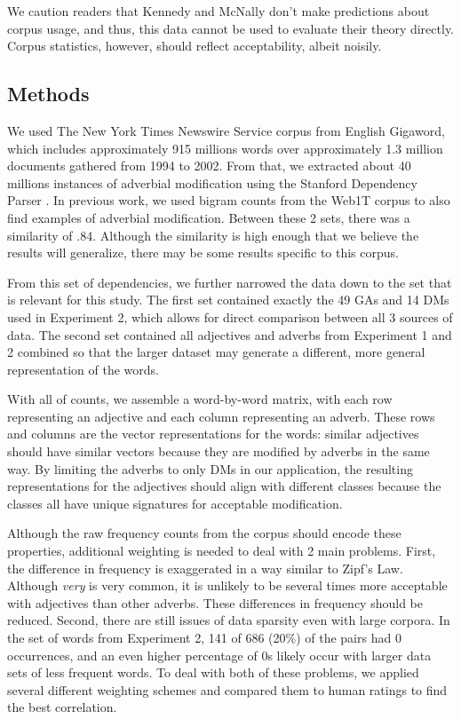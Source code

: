 \documentclass[11pt]{article}
\begin{document}
We caution readers that Kennedy and McNally  don't make predictions about corpus usage, and thus, this data cannot be used to evaluate their theory directly. Corpus statistics, however, should reflect acceptability, albeit noisily. 

\subsection{Methods}
We used The New York Times Newswire Service corpus from English Gigaword, which includes approximately 915 millions words over approximately 1.3 million documents gathered from 1994 to 2002. From that, we extracted about 40 millions instances of adverbial modification using the Stanford Dependency Parser \cite{marneffe}. In previous work, we used bigram counts from the Web1T corpus to also find examples of adverbial modification. Between these 2 sets, there was a similarity of .84. Although the similarity is high enough that we believe the results will generalize, there may be some results specific to this corpus.

From this set of dependencies, we further narrowed the data down to the set that is relevant for this study. The first set contained exactly the 49 GAs and 14 DMs used in Experiment 2, which allows for direct comparison between all 3 sources of data. The second set contained all adjectives and adverbs from Experiment 1 and 2 combined so that the larger dataset may generate a different, more general representation of the words.

With all of counts, we assemble a word-by-word matrix, with each row representing an adjective and each column representing an adverb. These rows and columns are the vector representations for the words: similar adjectives should have similar vectors because they are modified by adverbs in the same way. By limiting the adverbs to only DMs in our application, the resulting representations for the adjectives should align with different classes because the classes all have unique signatures for acceptable modification.

Although the raw frequency counts from the corpus should encode these properties, additional weighting is needed to deal with 2 main problems. First, the difference in frequency is exaggerated in a way similar to Zipf's Law. Although \textit{very} is very common, it is unlikely to be several times more acceptable with adjectives than other adverbs. These differences in frequency should be reduced. Second, there are still issues of data sparsity even with large corpora. In the set of words from Experiment 2, 141 of 686 (20\%) of the pairs had 0 occurrences, and an even higher percentage of 0s likely occur with larger data sets of less frequent words. To deal with both of these problems, we applied several different weighting schemes and compared them to human ratings to find the best correlation.
\end{document}

